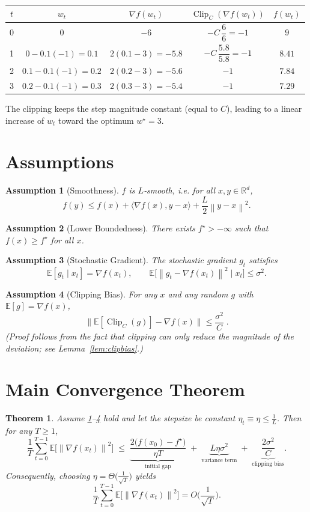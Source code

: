 \documentclass[11pt]{article}
\newtheorem{theorem}{Theorem}
\newtheorem{assumption}{Assumption}
\newcommand{\EE}{\mathbb{E}}
\newcommand{\norm}[1]{\left\lVert#1\right\rVert}
\begin{document}
\begin{center}
\begin{tabular}{c|c|c|c|c}
$t$ & $w_t$ & $\nabla f(w_t)$ & $\operatorname{Clip}_C(\nabla f(w_t))$ & $f(w_t)$\\\hline
0 & $0$ & $-6$ & $-C\,\dfrac{6}{6}=-1$ & $9$\\
1 & $0-0.1(-1)=0.1$ & $2(0.1-3)=-5.8$ & $-C\,\dfrac{5.8}{5.8}=-1$ & $8.41$\\
2 & $0.1-0.1(-1)=0.2$ & $2(0.2-3)=-5.6$ & $-1$ & $7.84$\\
3 & $0.2-0.1(-1)=0.3$ & $2(0.3-3)=-5.4$ & $-1$ & $7.29$
\end{tabular}
\end{center}
The clipping keeps the step magnitude constant (equal to $C$), leading to a linear increase of $w_t$ toward the optimum $w^\star=3$.

\newpage
\section*{Assumptions}
\begin{assumption}[Smoothness]\label{ass:smooth}
$f$ is $L$‑smooth, i.e. for all $x,y\in\mathbb{R}^d$,
\[
f(y)\le f(x)+\langle\nabla f(x),y-x\rangle+\frac{L}{2}\norm{y-x}^2 .
\]
\end{assumption}
\begin{assumption}[Lower Boundedness]\label{ass:lower}
There exists $f^\star>-\infty$ such that $f(x)\ge f^\star$ for all $x$.
\end{assumption}
\begin{assumption}[Stochastic Gradient]\label{ass:stoch}
The stochastic gradient $g_t$ satisfies
\[
\EE[g_t\mid x_t]=\nabla f(x_t),\qquad
\EE\big[\norm{g_t-\nabla f(x_t)}^2\mid x_t\big]\le\sigma^2 .
\]
\end{assumption}
\begin{assumption}[Clipping Bias]\label{ass:clipbias}
For any $x$ and any random $g$ with $\EE[g]=\nabla f(x)$,
\[
\big\|\EE[\operatorname{Clip}_C(g)]-\nabla f(x)\big\|\le \frac{\sigma^2}{C}\; .
\]
(Proof follows from the fact that clipping can only reduce the magnitude of the deviation; see Lemma~\ref{lem:clipbias}.) 
\end{assumption}

\section*{Main Convergence Theorem}
\begin{theorem}\label{thm:main}
Assume \ref{ass:smooth}–\ref{ass:clipbias} hold and let the stepsize be constant $\eta_t\equiv\eta\le\frac{1}{L}$. Then for any $T\ge1$,
\[
\frac{1}{T}\sum_{t=0}^{T-1}\EE\!\big[\norm{\nabla f(x_t)}^2\big]
\;\le\;
\underbrace{\frac{2\big(f(x_0)-f^\star\big)}{\eta T}}_{\text{initial gap}}
\;+\;
\underbrace{L\eta\sigma^2}_{\text{variance term}}
\;+\;
\underbrace{\frac{2\sigma^2}{C}}_{\text{clipping bias}} .
\]
Consequently, choosing $\eta=\Theta\!\big(\tfrac{1}{\sqrt{T}}\big)$ yields
\[
\frac{1}{T}\sum_{t=0}^{T-1}\EE\!\big[\norm{\nabla f(x_t)}^2\big]=O\!\Big(\frac{1}{\sqrt{T}}\Big).
\]
\end{theorem}
\end{document}
